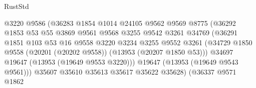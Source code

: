 \begin{lexlean}{RustStd}
\begin{coremodule}
                                        @3220
                                        @9586
                                        (@36283
                                          @1854
                                          @1014
                                          @24105
                                          @9562
                                          @9569
                                          @8775
                                          (@36292
                                            @1853
                                            @53
                                            @55
                                            @3869
                                            @9561
                                            @9568
                                            @3255
                                            @9542
                                            @3261
                                            @34769
                                            (@36291
                                              @1851
                                              @103
                                              @53
                                              @16
                                              @9558
                                              @3220
                                              @3234
                                              @3255
                                              @9552
                                              @3261
                                              (@34729
                                                @1850
                                                @9558
                                                (@20201 (@20202 @9558))
                                                (@13953 (@20207 @1850 @53)))
                                              @34697
                                              @19647
                                              (@13953 (@19649 @9553 @3220)))
                                            @19647
                                            (@13953 (@19649 @9543 @9561)))
                                          @35607
                                          @35610
                                          @35613
                                          @35617
                                          @35622
                                          @35628)
                                        (@36337
                                          @9571
                                          @1862

\end{coremodule}
\end{lexlean}
